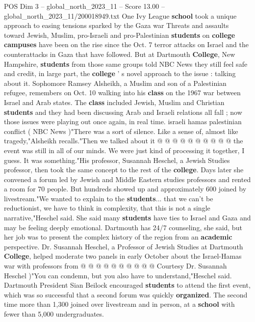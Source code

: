 \begin{textsample}{POS Dim 3 – global\_north\_2023\_11 – Score 13.00 – global\_north\_2023\_11/200018949.txt}  \label{ex:f3_pos_187}
One Ivy League \textbf{school} took a unique approach to easing tensions sparked by the Gaza war Threats and assaults toward Jewish, Muslim, pro-Israeli and pro-Palestinian \textbf{students} on \textbf{college} \textbf{campuses} have been on the rise since the Oct. 7 terror attacks on Israel and the counterattacks in Gaza that have followed.
But at Dartmouth \textbf{College}, New Hampshire, \textbf{students} from those same groups told NBC News they still feel safe and credit, in large part, the \textbf{college} ' s novel approach to the issue : talking about it.
Sophomore Ramsey Alsheikh, a Muslim and son of a Palestinian refugee, remembers on Oct. 10 walking into his \textbf{class} on the 1967 war between Israel and Arab states.
The \textbf{class} included Jewish, Muslim and Christian \textbf{students} and they had been discussing Arab and Israeli relations all fall ; now those issues were playing out once again, in real time. israeli hamas palestinian conflict ( NBC News )"There was a sort of silence.
Like a sense of, almost like tragedy,"Alsheikh recalls."Then we talked about it @ @ @ @ @ @ @ @ @ @ the event was still in all of our minds.
We were just kind of processing it together, I guess.
It was something."His professor, Susannah Heschel, a Jewish Studies professor, then took the same concept to the rest of the \textbf{college}.
Days later she convened a forum led by Jewish and Middle Eastern studies professors and rented a room for 70 people.
But hundreds showed up and approximately 600 joined by livestream."We wanted to explain to the \textbf{students}... that we can't be reductionist, we have to think in complexity, that this is not a single narrative,"Heschel said.
She said many \textbf{students} have ties to Israel and Gaza and may be feeling deeply emotional.
Dartmouth has 24/7 counseling, she said, but her job was to present the complex history of the region from an \textbf{academic} perspective.
Dr.
Susannah Heschel, a Professor of Jewish Studies at Dartmouth \textbf{College}, helped moderate two panels in early October about the Israel-Hamas war with professors from @ @ @ @ @ @ @ @ @ @ Courtesy Dr.
Susannah Heschel )"You can condemn, but you also have to understand,"Heschel said.
Dartmouth President Sian Beilock encouraged \textbf{students} to attend the first event, which was so successful that a second forum was quickly \textbf{organized}.
The second time more than 1,300 joined over livestream and in person, at a \textbf{school} with fewer than 5,000 undergraduates.

\end{textsample}
